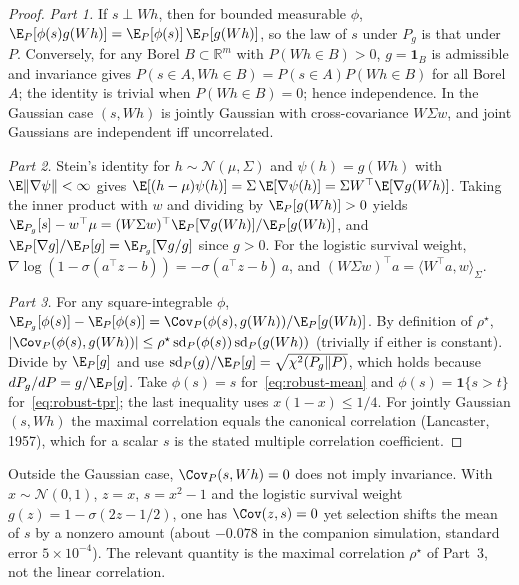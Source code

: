 \begin{proof}
\emph{Part 1.} If $s \perp Wh$, then for bounded measurable $\phi$, $\E_P[\phi(s) g(Wh)] = \E_P[\phi(s)]\,\E_P[g(Wh)]$, so the law of $s$ under $P_g$ is that under $P$. Conversely, for any Borel $B \subset \mathbb{R}^m$ with $P(Wh \in B) > 0$, $g = \mathbf{1}_B$ is admissible and invariance gives $P(s \in A, Wh \in B) = P(s \in A) P(Wh \in B)$ for all Borel $A$; the identity is trivial when $P(Wh \in B) = 0$; hence independence. In the Gaussian case $(s, Wh)$ is jointly Gaussian with cross-covariance $W \Sigma w$, and joint Gaussians are independent iff uncorrelated.

\emph{Part 2.} Stein's identity for $h \sim \mathcal{N}(\mu, \Sigma)$ and $\psi(h) = g(Wh)$ with $\E\|\nabla\psi\| < \infty$ gives $\E[(h - \mu)\psi(h)] = \Sigma\, \E[\nabla \psi(h)] = \Sigma W^\top \E[\nabla g(Wh)]$. Taking the inner product with $w$ and dividing by $\E_P[g(Wh)] > 0$ yields $\E_{P_g}[s] - w^\top \mu = (W\Sigma w)^\top \E_P[\nabla g(Wh)]/\E_P[g(Wh)]$, and $\E_P[\nabla g]/\E_P[g] = \E_{P_g}[\nabla g / g]$ since $g > 0$. For the logistic survival weight, $\nabla \log(1 - \sigma(a^\top z - b)) = -\sigma(a^\top z - b)\, a$, and $(W \Sigma w)^\top a = \langle W^\top a, w\rangle_\Sigma$.

\emph{Part 3.} For any square-integrable $\phi$, $\E_{P_g}[\phi(s)] - \E_P[\phi(s)] = \Cov_P(\phi(s), g(Wh)) / \E_P[g(Wh)]$. By definition of $\rho^\star$, $|\Cov_P(\phi(s), g(Wh))| \le \rho^\star \operatorname{sd}_P(\phi(s))\operatorname{sd}_P(g(Wh))$ (trivially if either is constant). Divide by $\E_P[g]$ and use $\operatorname{sd}_P(g)/\E_P[g] = \sqrt{\chi^2(P_g\|P)}$, which holds because $dP_g/dP = g/\E_P[g]$. Take $\phi(s) = s$ for~\eqref{eq:robust-mean} and $\phi(s) = \mathbf{1}\{s > t\}$ for~\eqref{eq:robust-tpr}; the last inequality uses $x(1-x) \le 1/4$. For jointly Gaussian $(s, Wh)$ the maximal correlation equals the canonical correlation (Lancaster, 1957), which for a scalar $s$ is the stated multiple correlation coefficient.
\end{proof}

\begin{remark}\label{rem:uncorrelated}
Outside the Gaussian case, $\Cov_P(s, Wh) = 0$ does not imply invariance. With $x \sim \mathcal{N}(0,1)$, $z = x$, $s = x^2 - 1$ and the logistic survival weight $g(z) = 1 - \sigma(2z - 1/2)$, one has $\Cov(z, s) = 0$ yet selection shifts the mean of $s$ by a nonzero amount (about $-0.078$ in the companion simulation, standard error $5 \times 10^{-4}$). The relevant quantity is the maximal correlation $\rho^\star$ of Part~3, not the linear correlation.
\end{remark}


